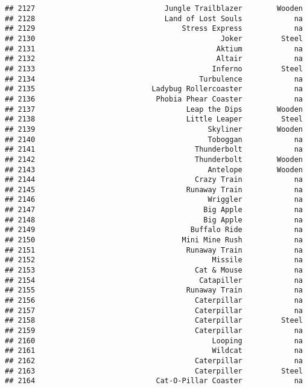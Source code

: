 \documentclass[
]{article}
\begin{document}
\begin{verbatim}
## 2127                              Jungle Trailblazer        Wooden
## 2128                              Land of Lost Souls            na
## 2129                                  Stress Express            na
## 2130                                           Joker         Steel
## 2131                                          Aktium            na
## 2132                                          Altair            na
## 2133                                         Inferno         Steel
## 2134                                      Turbulence            na
## 2135                           Ladybug Rollercoaster            na
## 2136                            Phobia Phear Coaster            na
## 2137                                   Leap the Dips        Wooden
## 2138                                   Little Leaper         Steel
## 2139                                        Skyliner        Wooden
## 2140                                        Toboggan            na
## 2141                                     Thunderbolt            na
## 2142                                     Thunderbolt        Wooden
## 2143                                        Antelope        Wooden
## 2144                                     Crazy Train            na
## 2145                                   Runaway Train            na
## 2146                                        Wriggler            na
## 2147                                       Big Apple            na
## 2148                                       Big Apple            na
## 2149                                    Buffalo Ride            na
## 2150                                  Mini Mine Rush            na
## 2151                                   Runaway Train            na
## 2152                                         Missile            na
## 2153                                     Cat & Mouse            na
## 2154                                      Catapiller            na
## 2155                                   Runaway Train            na
## 2156                                     Caterpillar            na
## 2157                                     Caterpillar            na
## 2158                                     Caterpillar         Steel
## 2159                                     Caterpillar            na
## 2160                                         Looping            na
## 2161                                         Wildcat            na
## 2162                                     Caterpillar            na
## 2163                                     Caterpiller         Steel
## 2164                            Cat-O-Pillar Coaster            na

\end{verbatim}
\end{document}
